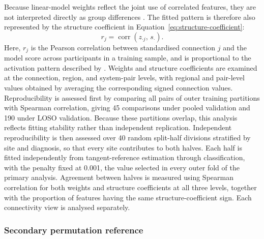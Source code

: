 Because linear-model weights reflect the joint use of correlated features, they are not interpreted directly as group differences \citep{Haufeetal2014}. The fitted pattern is therefore also represented by the structure coefficient in Equation~\eqref{eq:structure-coefficient}:
\begin{equation}
r_j = \operatorname{corr}\!\left(z_{\cdot j},\, s_{\cdot}\right).
\label{eq:structure-coefficient}
\end{equation}
Here, $r_j$ is the Pearson correlation between standardised connection $j$ and the model score across participants in a training sample, and is proportional to the activation pattern described by \citet{Haufeetal2014}. Weights and structure coefficients are examined at the connection, region, and system-pair levels, with regional and pair-level values obtained by averaging the corresponding signed connection values. Reproducibility is assessed first by comparing all pairs of outer training partitions with Spearman correlation, giving 45 comparisons under pooled validation and 190 under LOSO validation. Because these partitions overlap, this analysis reflects fitting stability rather than independent replication. Independent reproducibility is then assessed over 40 random split-half divisions stratified by site and diagnosis, so that every site contributes to both halves. Each half is fitted independently from tangent-reference estimation through classification, with the penalty fixed at 0.001, the value selected in every outer fold of the primary analysis. Agreement between halves is measured using Spearman correlation for both weights and structure coefficients at all three levels, together with the proportion of features having the same structure-coefficient sign. Each connectivity view is analysed separately.

\subsubsection{Secondary permutation reference}
\label{subsubsec:interpretation-permutation}


